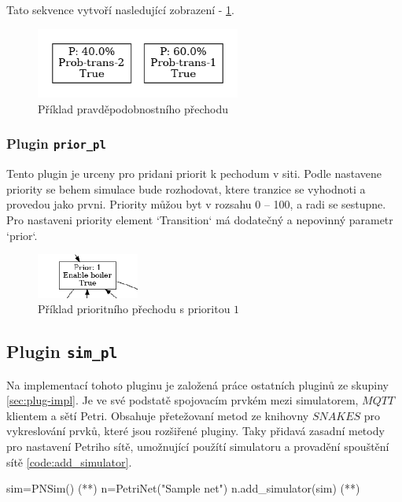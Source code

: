 Tato sekvence vytvoří nasledující zobrazení - \ref{prob-transition}.

\begin{figure}[hbt]
  \centering
  \includegraphics[width=0.6\textwidth]{obrazky-figures/prob-transition.png}
  \caption{Příklad pravděpodobnostního přechodu}
  \label{prob-transition}
\end{figure}

\subsubsection{Plugin \texttt{prior\_pl}}
\label{subsec:prior_pl}
Tento plugin je urceny pro pridani priorit k pechodum v siti. Podle nastavene priority se behem simulace bude rozhodovat, ktere tranzice se vyhodnoti a provedou jako prvni. Priority můžou byt v rozsahu 0 -- 100, a radi se sestupne. Pro nastaveni priority element `Transition` má dodatečný a nepovinný parametr `prior`. 
\begin{figure}[hbt]
  \centering
  \includegraphics[width=0.3\textwidth]{obrazky-figures/prior-transition.png}
  \caption{Příklad prioritního přechodu s prioritou $1$}
  \label{prior-transition}
\end{figure}

\subsection{Plugin \texttt{sim\_pl}}
\label{sec:aplikace-mqtt}
Na implementací tohoto pluginu je založená práce ostatních pluginů ze skupiny \ref{sec:plug-impl}. Je ve své podstatě spojovacím prvkém mezi simulatorem, $MQTT$ klientem a sětí Petri. Obsahuje přetežovaní metod ze knihovny $SNAKES$ pro vykreslování prvků, které jsou rozšiřené pluginy. Taky přidavá zasadní metody pro nastavení Petriho sítě, umožnující použítí simulatoru a provadění spouštění sítě \ref{code:add_simulator}.
\begin{python}
  sim=PNSim() (*\label{code:sim-add}*)
  n=PetriNet("Sample net")
  n.add_simulator(sim) (*\label{code:add_simulator}*)
\end{python}

